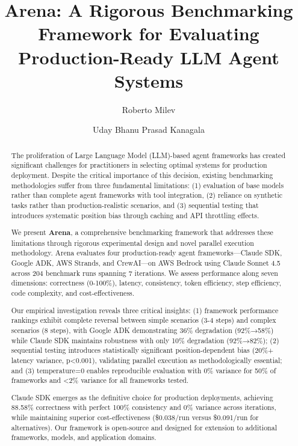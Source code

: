 \documentclass[sigconf,nonacm]{acmart}
\begin{document}
\title{Arena: A Rigorous Benchmarking Framework for Evaluating Production-Ready LLM Agent Systems}

\author{Roberto Milev}

\author{Uday Bhanu Prasad Kanagala}

\begin{abstract}
The proliferation of Large Language Model (LLM)-based agent frameworks has created significant challenges for practitioners in selecting optimal systems for production deployment. Despite the critical importance of this decision, existing benchmarking methodologies suffer from three fundamental limitations: (1) evaluation of base models rather than complete agent frameworks with tool integration, (2) reliance on synthetic tasks rather than production-realistic scenarios, and (3) sequential testing that introduces systematic position bias through caching and API throttling effects.

We present \textbf{Arena}, a comprehensive benchmarking framework that addresses these limitations through rigorous experimental design and novel parallel execution methodology. Arena evaluates four production-ready agent frameworks—Claude SDK, Google ADK, AWS Strands, and CrewAI—on AWS Bedrock using Claude Sonnet 4.5 across 204 benchmark runs spanning 7 iterations. We assess performance along seven dimensions: correctness (0-100\%), latency, consistency, token efficiency, step efficiency, code complexity, and cost-effectiveness.

Our empirical investigation reveals three critical insights: (1) framework performance rankings exhibit complete reversal between simple scenarios (3-4 steps) and complex scenarios (8 steps), with Google ADK demonstrating 36\% degradation (92\%→58\%) while Claude SDK maintains robustness with only 10\% degradation (92\%→82\%); (2) sequential testing introduces statistically significant position-dependent bias (20\%+ latency variance, p<0.001), validating parallel execution as methodologically essential; and (3) temperature=0 enables reproducible evaluation with 0\% variance for 50\% of frameworks and <2\% variance for all frameworks tested.

Claude SDK emerges as the definitive choice for production deployments, achieving 88.58\% correctness with perfect 100\% consistency and 0\% variance across iterations, while maintaining superior cost-effectiveness (\$0.038/run versus \$0.091/run for alternatives). Our framework is open-source and designed for extension to additional frameworks, models, and application domains.
\end{abstract}
\end{document}
